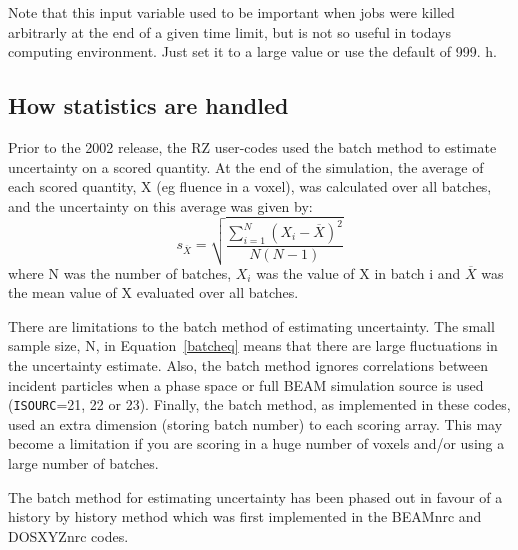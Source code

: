 \documentclass[12pt,twoside]{article}  %
\begin{document}
Note that this input variable used to be
important when jobs were killed arbitrarly at the end of a given time
limit, but is not so useful in todays computing environment. Just set it to
a large value or use the default of 999. h.

\subsection{How statistics are handled}
Prior to the 2002 release, the RZ user-codes used the batch method
to estimate uncertainty on a scored quantity.  At the end
of the simulation, the average of each scored quantity, X (eg fluence in
a voxel), was calculated over all batches, and the uncertainty on this
average was given by:
\begin{equation}
s_{\overline{X}} = \sqrt{\frac{\sum_{i=1}^{N}(X_i-{\overline{X}})^2}{N(N-1)}}
\label{batcheq}
\end{equation}
where N was the number of batches, $X_i$ was the value of X in batch i and
$\overline{X}$ was the mean value of X evaluated over all batches.

There are limitations to the batch method of estimating uncertainty.  The
small sample size, N, in Equation~\ref{batcheq} means that there are large
fluctuations in the uncertainty estimate.   Also, the batch method ignores
correlations between incident particles when a phase space or full
BEAM simulation source
is used ({\tt ISOURC}=21, 22 or 23).
Finally, the batch method, as implemented in these codes, used an extra
dimension (storing
batch number) to each scoring array.  This may become a limitation if you
are scoring in a huge number of voxels and/or using a large number of batches.

The batch method for estimating uncertainty has been phased out
in favour of a history by history method which was first implemented in the
BEAMnrc and DOSXYZnrc codes\cite{Wa02a}.
\end{document}
